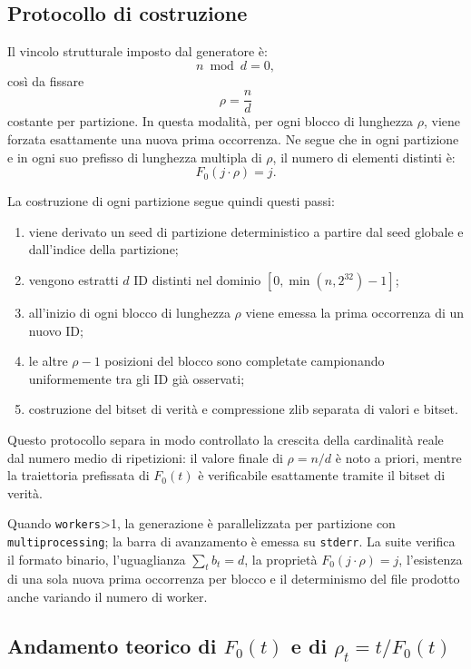 \subsection{Protocollo di costruzione}

Il vincolo strutturale imposto dal generatore è:
\[
n \bmod d = 0,
\]
così da fissare
\[
\rho=\frac{n}{d}
\]
costante per partizione. In questa modalità, per ogni blocco di lunghezza \(\rho\),
viene forzata esattamente una nuova prima occorrenza. Ne segue che in ogni partizione e in ogni suo prefisso di lunghezza multipla
di $\rho$, il numero di elementi distinti è:
\[
F_0(j\cdot \rho)=j.
\]

La costruzione di ogni partizione segue quindi questi passi:
\begin{enumerate}
    \item viene derivato un seed di partizione deterministico a partire dal
    seed globale e dall'indice della partizione;
    \item vengono estratti \(d\) ID distinti nel dominio
    \([0,\min(n,2^{32})-1]\);
    \item all'inizio di ogni blocco di lunghezza \(\rho\) viene emessa la prima
    occorrenza di un nuovo ID;
    \item le altre \(\rho-1\) posizioni del blocco sono completate campionando
    uniformemente tra gli ID già osservati;
    \item costruzione del bitset di verità e compressione zlib separata di valori e bitset.
\end{enumerate}

Questo protocollo separa in modo controllato la crescita della cardinalità reale
dal numero medio di ripetizioni: il valore finale di \(\rho=n/d\) è noto a priori,
mentre la traiettoria prefissata di \(F_0(t)\) è verificabile esattamente tramite
il bitset di verità.

Quando \texttt{workers}>1, la generazione è parallelizzata per partizione con
\texttt{multiprocessing}; la barra di avanzamento è emessa su \texttt{stderr}.
La suite 
verifica il formato binario, l'uguaglianza \(\sum_t b_t=d\), la proprietà
\(F_0(j\cdot \rho)=j\), l'esistenza di una sola nuova prima occorrenza per
blocco e il determinismo del file prodotto anche variando il numero di worker.

\subsection{Andamento teorico di \texorpdfstring{$F_0(t)$}{F0(t)} e di \texorpdfstring{$\rho_t=t/F_0(t)$}{rho\_t=t/F0(t)}}

